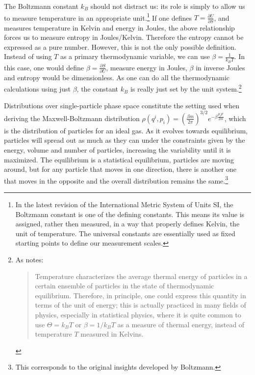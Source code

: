 \documentclass[iopart]{revtex4-1}
\begin{document}
The Boltzmann constant $k_B$ should not distract us: its role is simply to allow us to measure temperature in an appropriate unit.\footnote{In the latest revision of the International Metric System of Units SI,\cite{chyla2011evolution} the Boltzmann constant is one of the defining constants. This means its value is assigned, rather then measured, in a way that properly defines Kelvin, the unit of temperature. The universal constants are essentially used as fixed starting points to define our measurement scales.
}
If one defines $T = \frac{\partial U}{\partial S}$, and measures temperature in Kelvin and energy in Joules, the above relationship forces us to measure entropy in Joules/Kelvin. Therefore the entropy cannot be expressed as a pure number. However, this is not the only possible definition. Instead of using $T$ as a primary thermodynamic variable, we can use $\beta = \frac{1}{k_B T}$. In this case, one would define $\beta = \frac{\partial S}{\partial U}$, measure energy in Joules, $\beta$ in inverse Joules and entropy would be dimensionless. As one can do all the thermodynamic calculations using just $\beta$, the constant $k_B$ is really just set by the unit system.\footnote{As \cite{chyla2011evolution} notes:
\begin{quote}
	Temperature characterizes the average thermal energy of particles in a certain ensemble of particles in the state of thermodynamic equilibrium. Therefore, in principle, one could express this quantity in terms of the unit of energy; this is actually practiced in many fields of physics, especially in statistical physics, where it is quite common to use $\Theta = k_B T$ or $\beta = 1 / k_B T$  as a measure of thermal energy, instead of temperature $T$ measured in Kelvins.
\end{quote}
}

Distributions over single-particle phase space constitute the setting used when deriving the Maxwell-Boltzmann distribution $\rho(q^i, p_i) = \left(\frac{\beta m}{2\pi} \right)^{3/2}e^{-\beta \frac{p_ip^i}{2m}}$, which is the distribution of particles for an ideal gas. As it evolves towards equilibrium, particles will spread out as much as they can under the constraints given by the energy, volume and number of particles, increasing the variability until it is maximized. The equilibrium is a statistical equilibrium, particles are moving around, but for any particle that moves in one direction, there is another one that moves in the opposite and the overall distribution remains the same.\footnote{This corresponds to the original insights developed by Boltzmann.}
\end{document}
